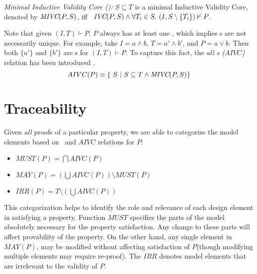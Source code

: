 \begin{definition}{\emph{Minimal Inductive Validity Core (\mivc):}}
  \label{def:minimal-ivc}
  $S \subseteq T$ is a minimal Inductive Validity Core,
  denoted by $\textit{MIVC}(P, S)$, iff ~$\textit{IVC}(P, S) \wedge \forall T_i \in S.~ (I, S\setminus\{ T_i \}) \nvdash P$.
\end{definition}

Note that given $(I, T) \vdash P$, $P$ always has at least one \mivc , which implies \mivc s are not necessarily unique.
For example, take $I = a \land b$, $T = a' \land b'$, and $P = a \lor
b$. Then both $\{a'\}$ and $\{b'\}$ are \mivc s for $(I, T)\vdash P$. To capture this fact, the \emph{all \mivc s ($AIVC$)} relation has been introduced \cite{Murugesan16:renext}.
$$ AIVC(P) \equiv  \{\ S~|~S \subseteq T \land  \textit{MIVC}(P, S)\} $$
\noindent



\section{Traceability}
Given {\em all} proofs of a particular property, we are able to categorize the model elements based on \mivc ~and
$AIVC$ relations for $P$:

\begin{itemize}
\item $MUST (P) = \bigcap AIVC(P)$
\item $MAY(P) = (\bigcup AIVC (P)) \setminus MUST (P)$
\item $IRR(P) = T \setminus (\bigcup AIVC (P))$
\end{itemize}

\noindent This categorization helps to identify the role and relevance of each design element in satisfying a property. Function $MUST$ specifies the parts of the model absolutely necessary for the property satisfaction.  Any change to these parts will affect provability of the property. On the other hand, any single element in $MAY (P)$, may be modified without affecting satisfaction of $P$(though modifying multiple elements may require re-proof). The $IRR$ denotes model elements that are irrelevant to the validity of $P$.

